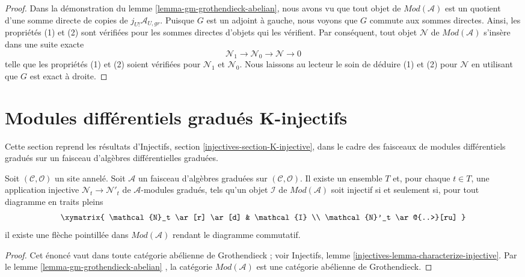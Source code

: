 \begin{proof}
\medskip\noindent
Dans la démonstration du lemme \ref{lemma-gm-grothendieck-abelian}, nous avons vu que tout objet de $\textit{Mod}(\mathcal{A})$ est un quotient d'une somme directe de copies de $j_{U!}\mathcal{A}_{U, gr}$.
Puisque $G$ est un adjoint à gauche, nous voyons que $G$ commute aux sommes directes.
Ainsi, les propriétés (1) et (2) sont vérifiées pour les sommes directes d'objets qui les vérifient.
Par conséquent, tout objet $\mathcal{N}$ de $\textit{Mod}(\mathcal{A})$ s'insère dans une suite exacte
$$
\mathcal{N}_1 \to \mathcal{N}_0 \to \mathcal{N} \to 0
$$
telle que les propriétés (1) et (2) soient vérifiées pour $\mathcal{N}_1$ et $\mathcal{N}_0$.
Nous laissons au lecteur le soin de déduire (1) et (2) pour $\mathcal{N}$ en utilisant que $G$ est exact à droite.
\end{proof}









\section{Modules différentiels gradués K-injectifs}
\label{section-K-injective}

\noindent
Cette section reprend les résultats d'Injectifs, section \ref{injectives-section-K-injective}, dans le cadre des faisceaux de modules différentiels gradués sur un faisceau d'algèbres différentielles graduées.

\begin{lemma}
\label{lemma-characterize-injectives}
Soit $(\mathcal{C}, \mathcal{O})$ un site annelé.
Soit $\mathcal{A}$ un faisceau d'algèbres graduées sur $(\mathcal{C}, \mathcal{O})$.
Il existe un ensemble $T$ et, pour chaque $t \in T$, une application injective $\mathcal{N}_t \to \mathcal{N}'_t$ de $\mathcal{A}$-modules gradués, tels qu'un objet $\mathcal{I}$ de $\textit{Mod}(\mathcal{A})$ soit injectif si et seulement si, pour tout diagramme en traits pleins
$$
\xymatrix{
\mathcal{N}_t \ar[r] \ar[d] & \mathcal{I} \\
\mathcal{N}'_t \ar@{..>}[ru]
}
$$
il existe une flèche pointillée dans $\textit{Mod}(\mathcal{A})$ rendant le diagramme commutatif.
\end{lemma}

\begin{proof}
Cet énoncé vaut dans toute catégorie abélienne de Grothendieck ; voir Injectifs, lemme \ref{injectives-lemma-characterize-injective}.
Par le lemme \ref{lemma-gm-grothendieck-abelian} , la catégorie $\textit{Mod}(\mathcal{A})$ est une catégorie abélienne de Grothendieck.
\end{proof}

